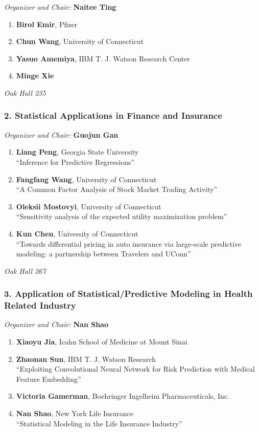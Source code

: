 \emph{Organizer and Chair:} \textbf{Naitee Ting}

\begin{enumerate}
\item \textbf{Birol Emir}, Pfizer 
\item \textbf{Chun Wang}, University of Connecticut 
\item \textbf{Yasuo Amemiya}, IBM T. J. Watson Research Center 
\item \textbf{Minge Xie} 
\end{enumerate}

\emph{Oak Hall 235} \\[.5em]

\subsubsection*{2. Statistical Applications in Finance and Insurance}

\emph{Organizer and Chair:} \textbf{Guojun Gan}

\begin{enumerate}
\item \textbf{Liang Peng}, Georgia State University \\
``Inference for Predictive Regressions''
\item \textbf{Fangfang Wang}, University of Connecticut \\
``A Common Factor Analysis of  Stock Market Trading Activity''
\item \textbf{Oleksii Mostovyi}, University of Connecticut \\
``Sensitivity analysis of the expected utility maximization problem''
\item \textbf{Kun Chen}, University of Connecticut \\
``Towards differential pricing in auto insurance via large-scale predictive modeling: a partnership between Travelers and UConn''
\end{enumerate}

\emph{Oak Hall 267} \\[.5em]

\subsubsection*{3. Application of Statistical/Predictive Modeling in Health Related Industry}

\emph{Organizer and Chair:} \textbf{Nan Shao}

\begin{enumerate}
\item \textbf{Xiaoyu Jia}, Icahn School of Medicine at Mount Sinai 
\item \textbf{Zhaonan Sun}, IBM T. J. Watson Research \\
``Exploiting Convolutional Neural Network for Risk Prediction with Medical Feature Embedding''
\item \textbf{Victoria Gamerman}, Boehringer Ingelheim Pharmaceuticals, Inc. 
\item \textbf{Nan Shao}, New York Life Insurance \\
``Statistical Modeling in the Life Insurance Industry''
\end{enumerate}

